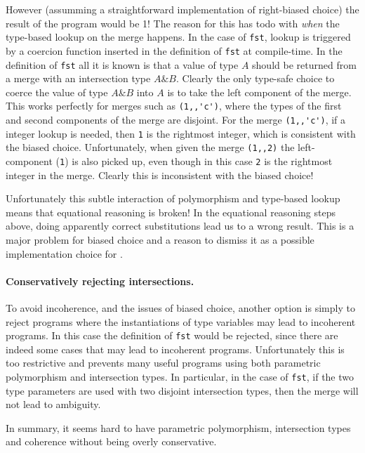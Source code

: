 However (assumming a straightforward implementation of right-biased
choice) the result of the program would be 1! The reason for this has
todo with \emph{when} the type-based lookup on the merge happens. In
the case of \lstinline{fst}, lookup is triggered by a coercion
function inserted in the definition of \lstinline{fst} at
compile-time.
In the definition of \lstinline$fst$ all it is known is that a
value of type $A$ should be returned from a merge with an intersection
type $A\&B$.  Clearly the only type-safe choice to coerce the value of
type $A\&B$ into $A$ is to
take the left component of the merge. This works perfectly for merges
such as \lstinline$(1,,'c')$, where the types of the first and second components
of the merge are disjoint. For the merge \lstinline$(1,,'c')$, if a integer lookup
is needed, then \lstinline$1$ is the rightmost integer, which is consistent with the
biased choice. Unfortunately, when given the merge \lstinline$(1,,2)$ the
left-component (\lstinline$1$) is also picked up, even though in this case \lstinline$2$
is the rightmost integer in the merge. Clearly this is inconsistent
with the biased choice!

Unfortunately this subtle interaction of polymorphism and type-based lookup
 means that equational reasoning is broken!
In the equational reasoning steps above, doing apparently correct
substitutions lead us to a wrong result. This is a major problem for
biased choice and a reason to dismiss it as a possible implementation
choice for \namedis.

\paragraph{Conservatively rejecting intersections.}
To avoid incoherence, and the issues of biased choice, another option
is simply to reject programs where the
instantiations of type variables may lead to incoherent programs.
In this case the definition of \lstinline$fst$ would be rejected, since there
are indeed some cases that may lead to incoherent programs.
Unfortunately this is too restrictive and prevents many useful
programs using both parametric polymorphism and intersection types.
In particular, in the case of \lstinline{fst}, if the two type
parameters are used with two disjoint intersection
types, then the merge will not lead to ambiguity.

In summary, it seems hard to have parametric polymorphism, intersection
types and coherence without being overly conservative.

